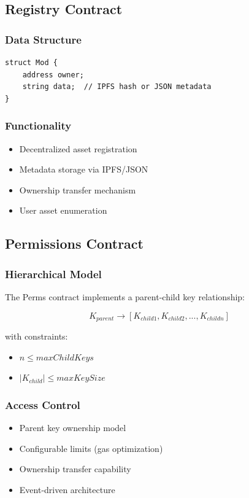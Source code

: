 \documentclass[11pt,a4paper]{article}
\begin{document}
\subsection{Registry Contract}

\subsubsection{Data Structure}

\begin{lstlisting}
struct Mod {
    address owner;
    string data;  // IPFS hash or JSON metadata
}
\end{lstlisting}

\subsubsection{Functionality}
\begin{itemize}
\item Decentralized asset registration
\item Metadata storage via IPFS/JSON
\item Ownership transfer mechanism
\item User asset enumeration
\end{itemize}

\subsection{Permissions Contract}

\subsubsection{Hierarchical Model}

The Perms contract implements a parent-child key relationship:

\begin{equation}
K_{parent} \rightarrow [K_{child1}, K_{child2}, ..., K_{childn}]
\end{equation}

with constraints:
\begin{itemize}
\item $n \leq maxChildKeys$
\item $|K_{child}| \leq maxKeySize$
\end{itemize}

\subsubsection{Access Control}
\begin{itemize}
\item Parent key ownership model
\item Configurable limits (gas optimization)
\item Ownership transfer capability
\item Event-driven architecture
\end{itemize}
\end{document}
